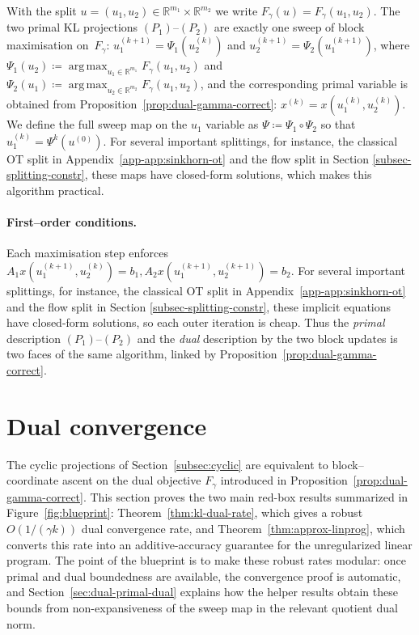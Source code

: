 \documentclass{article}
\newcommand{\argmax}{\mathop{\mathrm{arg\,max}}}
\theoremstyle{plain}
\newcommand{\eqdef}{\coloneqq}
\newcommand{\RR}{\mathbb{R}}
\begin{document}
With the split $u=(u_{1},u_{2})\in\RR^{m_{1}}\times\RR^{m_{2}}$ we write $F_{\gamma}(u)=F_{\gamma}(u_{1},u_{2})$.  
The two primal KL projections $(P_1)$--$(P_2)$ are exactly one sweep of block maximisation on~$F_{\gamma}$: $u^{(k+1)}_1=\Psi_1(u^{(k)}_2)$ and $u^{(k+1)}_2=\Psi_2(u^{(k+1)}_1)$, where $\Psi_1(u_2)\eqdef\argmax_{u_1\in\RR^{m_1}}F_\gamma(u_1,u_2)$ and $\Psi_2(u_1)\eqdef\argmax_{u_2\in\RR^{m_2}}F_\gamma(u_1,u_2)$,
and the corresponding primal variable is obtained from Proposition~\ref{prop:dual-gamma-correct}:
$x^{(k)}=x(u_{1}^{(k)},u_{2}^{(k)})$. We define the full sweep map on the $u_1$ variable as $\Psi \eqdef \Psi_1 \circ \Psi_2$ so that $u_1^{(k)}=\Psi^k(u^{(0)})$.
%
For several important splittings, for instance, the classical OT split in Appendix~\ref{app-app:sinkhorn-ot} and the flow split in Section \ref{subsec-splitting-constr}, these maps have closed-form solutions, which makes this algorithm practical.

\paragraph{First--order conditions.}
Each maximisation step enforces
$
	A_{1}x(u_{1}^{(k+1)},u_{2}^{(k)}) = b_{1},  
	A_{2}x(u_{1}^{(k+1)},u_{2}^{(k+1)}) = b_{2}.
$
For several important splittings, for instance, the classical OT split in Appendix~\ref{app-app:sinkhorn-ot} and the flow split in Section \ref{subsec-splitting-constr}, these implicit equations have closed-form solutions, so each outer iteration is cheap.  
%
Thus the \emph{primal} description $(P_1)$--$(P_2)$ and the \emph{dual} description by the two block updates is two faces of the same algorithm, linked by Proposition~\ref{prop:dual-gamma-correct}.
\fi 


\section{Dual convergence}
\label{sec:dual-conv}

The cyclic projections of Section~\ref{subsec:cyclic} are equivalent to block--coordinate ascent on the dual objective $F_{\gamma}$ introduced in Proposition~\ref{prop:dual-gamma-correct}. This section proves the two main red-box results summarized in Figure~\ref{fig:blueprint}: Theorem~\ref{thm:kl-dual-rate}, which gives a robust $O(1/(\gamma k))$ dual convergence rate, and Theorem~\ref{thm:approx-linprog}, which converts this rate into an additive-accuracy guarantee for the unregularized linear program. The point of the blueprint is to make these robust rates modular: once primal and dual boundedness are available, the convergence proof is automatic, and Section~\ref{sec:dual-primal-dual} explains how the helper results obtain these bounds from non-expansiveness of the sweep map in the relevant quotient dual norm.
\label{subsec:mainresult}
\end{document}
